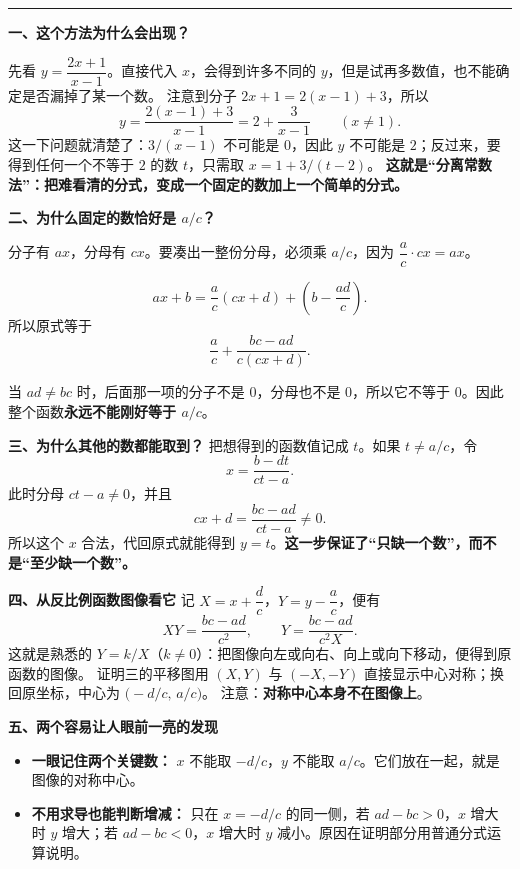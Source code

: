 \begin{explanationbox}
    \medskip
    \hrule
    \medskip

    \textbf{\textcolor{CExplanation}{一、这个方法为什么会出现？}}

    先看 $y=\dfrac{2x+1}{x-1}$。直接代入 $x$，会得到许多不同的 $y$，但是试再多数值，也不能确定是否漏掉了某一个数。
    注意到分子 $2x+1=2(x-1)+3$，所以
    \[
        y=\frac{2(x-1)+3}{x-1}=2+\frac3{x-1}\qquad(x\ne1).
    \]
    这一下问题就清楚了：$3/(x-1)$ 不可能是 $0$，因此 $y$ 不可能是 $2$；反过来，要得到任何一个不等于 $2$ 的数 $t$，只需取 $x=1+3/(t-2)$。
    \textbf{这就是“分离常数法”：把难看清的分式，变成一个固定的数加上一个简单的分式。}

    \medskip
    \textbf{\textcolor{CExplanation}{二、为什么固定的数恰好是 $a/c$？}}
    \begin{description}[style=nextline, leftmargin=2.8em, labelsep=0.5em, itemsep=0.45em]
        \item[\textbf{第一眼（先看 $x$ 前面的数）：}]
            分子有 $ax$，分母有 $cx$。要凑出一整份分母，必须乘 $a/c$，因为 $\dfrac ac\cdot cx=ax$。
        \item[\textbf{第二眼（把多余的数算出来）：}]
            \[
                ax+b=\frac ac(cx+d)+\left(b-\frac{ad}{c}\right).
            \]
            所以原式等于
            \[
                \frac ac+\frac{bc-ad}{c(cx+d)}.
            \]
        \item[\textbf{第三眼（为什么总差一个数）：}]
            当 $ad\ne bc$ 时，后面那一项的分子不是 $0$，分母也不是 $0$，所以它不等于 $0$。因此整个函数\textbf{永远不能刚好等于 $a/c$}。
    \end{description}

    \medskip
    \textbf{\textcolor{CExplanation}{三、为什么其他的数都能取到？}}
    把想得到的函数值记成 $t$。如果 $t\ne a/c$，令
    \[
        x=\frac{b-dt}{ct-a}.
    \]
    此时分母 $ct-a\ne0$，并且
    \[
        cx+d=\frac{bc-ad}{ct-a}\ne0.
    \]
    所以这个 $x$ 合法，代回原式就能得到 $y=t$。\textbf{这一步保证了“只缺一个数”，而不是“至少缺一个数”。}

    \medskip
    \textbf{\textcolor{CExplanation}{四、从反比例函数图像看它}}
    记 $X=x+\dfrac dc$，$Y=y-\dfrac ac$，便有
    \[
        XY=\frac{bc-ad}{c^2},\qquad
        Y=\frac{bc-ad}{c^2X}.
    \]
    这就是熟悉的 $Y=k/X$（$k\ne0$）：把图像向左或向右、向上或向下移动，便得到原函数的图像。
    证明三的平移图用 $(X,Y)$ 与 $(-X,-Y)$ 直接显示中心对称；换回原坐标，中心为 $\bigl(-d/c,\,a/c\bigr)$。
    注意：\textbf{对称中心本身不在图像上}。

    \medskip
    \textbf{\textcolor{CExplanation}{五、两个容易让人眼前一亮的发现}}
    \begin{itemize}[leftmargin=*, itemsep=0.5em, topsep=0.4em]
        \item \textbf{一眼记住两个关键数：} $x$ 不能取 $-d/c$，$y$ 不能取 $a/c$。它们放在一起，就是图像的对称中心。
        \item \textbf{不用求导也能判断增减：} 只在 $x=-d/c$ 的同一侧，若 $ad-bc>0$，$x$ 增大时 $y$ 增大；若 $ad-bc<0$，$x$ 增大时 $y$ 减小。原因在证明部分用普通分式运算说明。
    \end{itemize}
\end{explanationbox}
